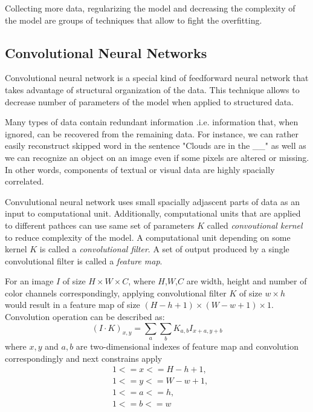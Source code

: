 Collecting more data, regularizing the model and decreasing the complexity of the model are groups of techniques that allow to fight the overfitting.




\subsection{Convolutional Neural Networks}
\label{ch:cnn}

Convolutional neural network is a special kind of feedforward neural network that takes advantage of structural organization of the data. This technique allows to decrease number of parameters of the model when applied to structured data.

Many types of data contain redundant information .i.e. information that, when ignored, can be recovered from the remaining data.
For instance, we can rather easily reconstruct skipped word in the sentence "Clouds are in the \_\_" as well as we can recognize an object on an image even if some pixels are altered or missing.
In other words, components of textual or visual data are highly spacially correlated.

Convulutional neural network uses small spacially adjascent parts of data as an input to computational unit. Additionally, computational units that are applied to different pathces can use same set of parameters $K$ called \textit{convoutional kernel} to reduce complexity of the model. A computational unit depending on some kernel $K$ is called a \textit{convolutional filter}. A set of output produced by a single convolutional filter is called a \textit{feature map}.



For an image $I$ of size $H \times W \times C$, where $H$,$W$,$C$ are width, height and number of color channels correspondingly, applying convolutional filter $K$ of size $w \times h$ would result in a feature map of size $(H-h+1) \times (W-w+1) \times 1$. Convolution operation can be described as:
\begin{equation}\label{eq:conv}
  (I \cdot K)_{x, y} = \sum_a \sum_b K_{a,b} I_{x+a, y+b}
\end{equation}
where ${x, y}$ and ${a,b}$ are two-dimensional indexes of feature map and convolution correspondingly and next constrains apply
\begin{equation*}
  \begin{align}
  &1 <=  x <= H-h+1, \\
  &1 <=  y <= W-w+1, \\
  &1 <=  a <= h, \\
  &1 <=  b <= w
  \end{align}
\end{equation*}

